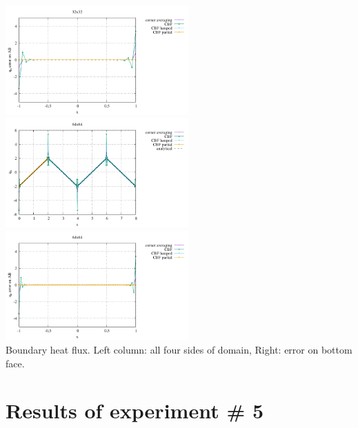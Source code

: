 \begin{center}
\includegraphics[width=7cm]{python_codes/fieldstone_173/results/exp4/heat_flux_boundary_bottom_32.pdf}\\
\includegraphics[width=7cm]{python_codes/fieldstone_173/results/exp4/heat_flux_boundary_64.pdf}
\includegraphics[width=7cm]{python_codes/fieldstone_173/results/exp4/heat_flux_boundary_bottom_64.pdf}\\
{\captionfont Boundary heat flux. Left column: all four sides of domain, Right: error on bottom face.}
\end{center}

\newpage
\section*{Results of experiment \# 5}

